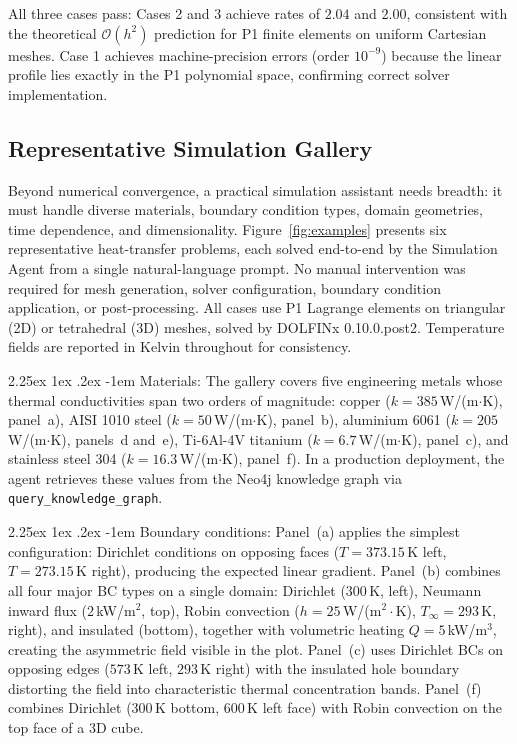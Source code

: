 \documentclass[preprint,review,12pt]{elsarticle}
\makeatletter
\renewcommand\paragraph{\@startsection{paragraph}{4}{\z@}%
  {2.25ex \@plus1ex \@minus.2ex}%
  {-1em}%
  {\normalfont\normalsize\bfseries}}
\makeatother
\begin{document}
All three cases pass: Cases 2 and 3 achieve rates of $2.04$ and $2.00$,
consistent with the theoretical $\mathcal{O}(h^2)$ prediction for P1
finite elements on uniform Cartesian meshes.  Case 1 achieves machine-precision
errors (order $10^{-9}$) because the linear profile lies exactly in the P1
polynomial space, confirming correct solver implementation.

\subsection{Representative Simulation Gallery}
\label{sec:gallery}

Beyond numerical convergence, a practical simulation assistant needs
breadth: it must handle diverse materials, boundary
condition types, domain geometries, time dependence, and dimensionality.
Figure~\ref{fig:examples} presents six representative heat-transfer
problems, each solved end-to-end by the Simulation Agent from a single
natural-language prompt.  No manual intervention was required for mesh
generation, solver configuration, boundary condition application, or
post-processing.  All cases use P1 Lagrange elements on triangular
(2D) or tetrahedral (3D) meshes, solved by DOLFINx 0.10.0.post2.
Temperature fields are reported in Kelvin throughout for consistency.

\paragraph{Materials:}
The gallery covers five engineering metals whose thermal
conductivities span two orders of magnitude:
copper ($k=385$\,W/(m$\cdot$K), panel~a),
AISI 1010 steel ($k=50$\,W/(m$\cdot$K), panel~b),
aluminium 6061 ($k=205$\,W/(m$\cdot$K), panels~d and~e),
Ti-6Al-4V titanium ($k=6.7$\,W/(m$\cdot$K), panel~c),
and stainless steel 304 ($k=16.3$\,W/(m$\cdot$K), panel~f).
In a production deployment, the agent retrieves these values from the
Neo4j knowledge graph via \texttt{query\_knowledge\_graph}.

\paragraph{Boundary conditions:}
Panel~(a) applies the simplest configuration: Dirichlet conditions on
opposing faces ($T=373.15$\,K left, $T=273.15$\,K right), producing
the expected linear gradient.  Panel~(b) combines all four major
BC types on a single domain: Dirichlet ($300$\,K, left), Neumann
inward flux ($2$\,kW/m$^2$, top), Robin convection ($h=25$\,W/(m$^2
\cdot$K), $T_\infty=293$\,K, right), and insulated (bottom), together
with volumetric heating $Q=5$\,kW/m$^3$, creating the asymmetric
field visible in the plot.  Panel~(c) uses Dirichlet BCs on opposing
edges ($573$\,K left, $293$\,K right) with the insulated hole boundary
distorting the field into characteristic thermal concentration bands.
Panel~(f) combines Dirichlet ($300$\,K bottom, $600$\,K left face)
with Robin convection on the top face of a 3D cube.
\end{document}
